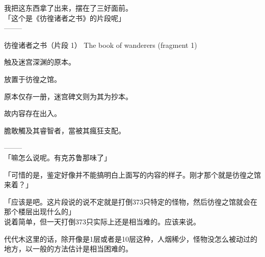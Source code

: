 我把这东西拿了出来，摆在了三好面前。\\

「这个是《彷徨诸者之书》的片段呢」\\

  --------

  彷徨诸者之书（片段 1） The book of wanderers (fragment 1)

%  
 

  触及迷宫深渊的原本。

  放置于彷徨之馆。

%  
 

  原本仅存一册，迷宫碑文则为其为抄本。

  故内容存在出入。

%  
 

  膽敢觸及其睿智者，當被其瘋狂支配。

  --------\\

「嘛怎么说呢。有克苏鲁那味了」

「可惜的是，鉴定好像并不能搞明白上面写的内容的样子。刚才那个就是彷徨之馆来着？」

「应该是吧。这片段说的说不定就是打倒373只特定的怪物，然后彷徨之馆就会在那个楼层出现什么的」\\

说着简单，但一天打倒373只实际上还是相当难的。应该来说。

代代木这里的话，除开像是1层或者是10层这种，人烟稀少，怪物没怎么被动过的地方，以一般的方法估计是相当困难的。\\

